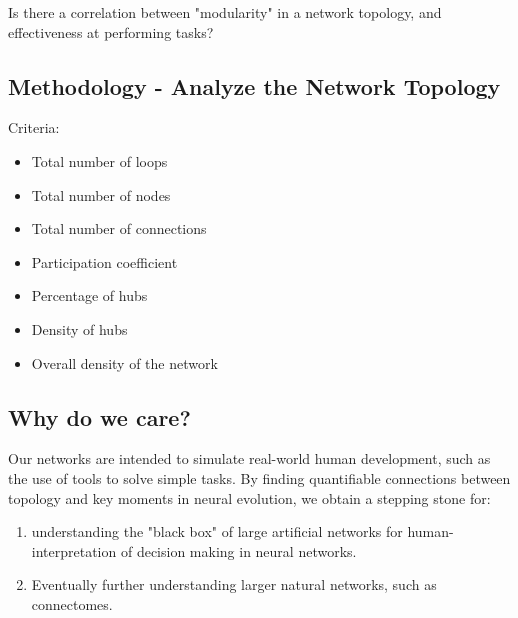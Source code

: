 \documentclass{article}
\begin{document}
Is there a correlation between "modularity" in a network topology, and effectiveness at performing tasks?

\subsection{Methodology - Analyze the Network Topology}
    Criteria:
    \begin{itemize}
        \item Total number of loops
	\item Total number of nodes
	\item Total number of connections
        \item Participation coefficient \cite{guimera_functional_2005}
        \item Percentage of hubs
        \item Density of hubs
        \item Overall density of the network
    \end{itemize}

\subsection{Why do we care?}
Our networks are intended to simulate real-world human development, such as the use of tools to solve simple tasks. By finding quantifiable connections between topology and key moments in neural evolution, we obtain a stepping stone for:
\begin{enumerate}
    \item understanding the "black box" of large artificial networks for human-interpretation of decision making in neural networks.
    \item Eventually further understanding larger natural networks, such as connectomes.
\end{enumerate}
\end{document}
